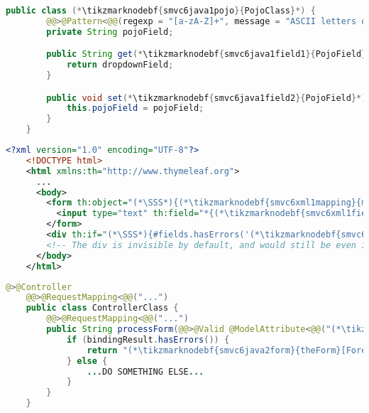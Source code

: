 \enlargethispage{10mm}
\thispagestyle{empty}
\begin{lstlisting}[language=Java, title={POJO class with restricted String field}]
    public class (*\tikzmarknodebf{smvc6java1pojo}{PojoClass}*) {
        @@>@Pattern<@@(regexp = "[a-zA-Z]+", message = "ASCII letters only")
        private String pojoField;

        public String get(*\tikzmarknodebf{smvc6java1field1}{PojoField}*)() {
            return dropdownField;
        }

        public void set(*\tikzmarknodebf{smvc6java1field2}{PojoField}*)(String pojoField) {
            this.pojoField = pojoField;
        }
    }
\end{lstlisting}
\begin{lstlisting}[language=XML, title={HTML form \tikzmarknodebf{smvc6xml1form}{\textit{theForm}}\textit{.html} setting the field}]
    <?xml version="1.0" encoding="UTF-8"?>
    <!DOCTYPE html>
    <html xmlns:th="http://www.thymeleaf.org">
      ...
      <body>
        <form th:object="(*\SSS*){(*\tikzmarknodebf{smvc6xml1mapping}{mappingId}[ForestGreen]*)}" ...>
          <input type="text" th:field="*{(*\tikzmarknodebf{smvc6xml1field1}{pojoField}[ForestGreen]*)}">
        </form>
        <div th:if="(*\SSS*){#fields.hasErrors('(*\tikzmarknodebf{smvc6xml1field2}{pojoField}[ForestGreen]*)')}" th:errors="*{(*\tikzmarknodebf{smvc6xml1field3}{pojoField}[ForestGreen]*)}"/>
        <!-- The div is invisible by default, and would still be even if it had some content -->
      </body>
    </html>
\end{lstlisting}
\begin{lstlisting}[language=Java, title={Controller processing the form}]
    @>@Controller
    @@>@RequestMapping<@@("...")
    public class ControllerClass {
        @@>@RequestMapping<@@("...")
        public String processForm(@@>@Valid @ModelAttribute<@@("(*\tikzmarknodebf{smvc6java2mapping}{mappingId}[ForestGreen]*)") (*\tikzmarknodebf{smvc6java2pojo}{PojoClass}*) pojo, BindingResult bindingResult) {
            if (bindingResult.hasErrors()) {
                return "(*\tikzmarknodebf{smvc6java2form}{theForm}[ForestGreen]*)";
            } else {
                ...DO SOMETHING ELSE...
            }
        }
    }
\end{lstlisting}
\newpage

